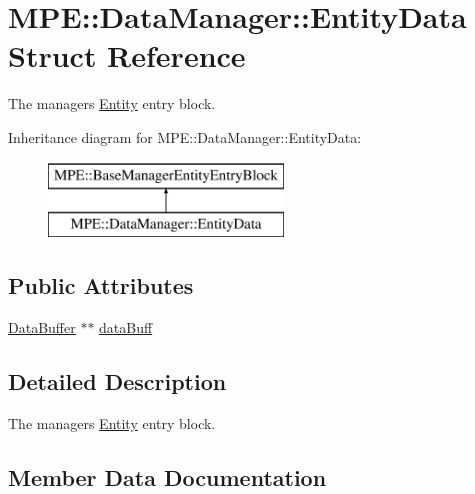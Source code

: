 \hypertarget{struct_m_p_e_1_1_data_manager_1_1_entity_data}{}\section{M\+PE\+:\+:Data\+Manager\+:\+:Entity\+Data Struct Reference}
\label{struct_m_p_e_1_1_data_manager_1_1_entity_data}


The managers \hyperlink{struct_m_p_e_1_1_entity}{Entity} entry block.  


Inheritance diagram for M\+PE\+:\+:Data\+Manager\+:\+:Entity\+Data\+:\begin{figure}[H]
\begin{center}
\leavevmode
\includegraphics[height=2.000000cm]{struct_m_p_e_1_1_data_manager_1_1_entity_data}
\end{center}
\end{figure}
\subsection*{Public Attributes}
\begin{DoxyCompactItemize}
\item 
\hyperlink{struct_m_p_e_1_1_data_manager_1_1_data_buffer}{Data\+Buffer} $\ast$$\ast$ \hyperlink{struct_m_p_e_1_1_data_manager_1_1_entity_data_a93b9cee26b2194ff28d2d6c659b0fa97}{data\+Buff}
\end{DoxyCompactItemize}


\subsection{Detailed Description}
The managers \hyperlink{struct_m_p_e_1_1_entity}{Entity} entry block. 

\subsection{Member Data Documentation}
\mbox{\label{struct_m_p_e_1_1_data_manager_1_1_entity_data_a93b9cee26b2194ff28d2d6c659b0fa97}} 
